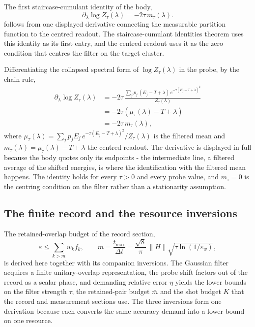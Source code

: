 The first staircase-cumulant identity of the body,
\begin{equation*}
\partial_\lambda \log Z_\tau(\lambda) = -2\tau \, m_\tau(\lambda) .
\end{equation*}
follows from one displayed derivative connecting the measurable partition function to the centred readout. The staircase-cumulant identities theorem uses this identity as its first entry, and the centred readout uses it as the zero condition that centres the filter on the target cluster.

Differentiating the collapsed spectral form of $\log Z_\tau(\lambda)$ in the probe, by the chain rule,
\begin{align*}
\partial_\lambda \log Z_\tau(\lambda)
&= -2\tau \, \frac{\sum_j p_j \, (E_j - T + \lambda) \, e^{-\tau (E_j - T + \lambda)^2}}{Z_\tau(\lambda)} \\
&= -2\tau \left( \mu_\tau(\lambda) - T + \lambda \right) \\
&= -2\tau \, m_\tau(\lambda) ,
\end{align*}
where $\mu_\tau(\lambda) = \sum_j p_j E_j \, e^{-\tau (E_j - T + \lambda)^2} / Z_\tau(\lambda)$ is the filtered mean and $m_\tau(\lambda) = \mu_\tau(\lambda) - T + \lambda$ the centred readout. The derivative is displayed in full because the body quotes only its endpoints - the intermediate line, a filtered average of the shifted energies, is where the identification with the filtered mean happens. The identity holds for every $\tau > 0$ and every probe value, and $m_\tau = 0$ is the centring condition on the filter rather than a stationarity assumption.

\subsection*{The finite record and the resource inversions}

The retained-overlap budget of the record section,
\begin{equation*}
\varepsilon \le \sum_{k > \bar m} w_k f_k , \qquad
\bar m = \frac{t_{\max}}{\Delta t} = \frac{\sqrt{8}}{\pi} \, \|H\| \sqrt{\tau \ln(1/\varepsilon_w)} ,
\end{equation*}
is derived here together with its companion inversions. The Gaussian filter acquires a finite unitary-overlap representation, the probe shift factors out of the record as a scalar phase, and demanding relative error $\eta$ yields the lower bounds on the filter strength $\tau$, the retained-pair budget $\bar m$ and the shot budget $K$ that the record and measurement sections use. The three inversions form one derivation because each converts the same accuracy demand into a lower bound on one resource.

